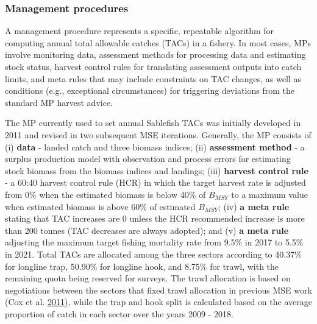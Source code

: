 \documentclass[11pt]{book}
\begin{document}
\hypertarget{management-procedures}{%
\subsubsection{Management procedures}\label{management-procedures}}

A management procedure represents a specific, repeatable algorithm for computing annual total allowable catches (TACs) in a fishery. In most cases, MPs involve monitoring data, assessment methods for processing data and estimating stock status, harvest control rules for translating assessment outputs into catch limits, and meta rules that may include constraints on TAC changes, as well as conditions (e.g., exceptional circumstances) for triggering deviations from the standard MP harvest advice.

The MP currently used to set annual Sablefish TACs was initially developed in 2011 and revised in two subsequent MSE iterations. Generally, the MP consists of (i) \textbf{data} - landed catch and three biomass indices; (ii) \textbf{assessment method} - a surplus production model with observation and process errors for estimating stock biomass from the biomass indices and landings; (iii) \textbf{harvest control rule} - a 60:40 harvest control rule (HCR) in which the target harvest rate is adjusted from 0\% when the estimated biomass is below 40\% of \(B_{MSY}\) to a maximum value when estimated biomass is above 60\% of estimated \(B_{MSY}\); (iv) \textbf{a meta rule} stating that TAC increases are 0 unless the HCR recommended increase is more than 200 tonnes (TAC decreases are always adopted); and (v) \textbf{a meta rule} adjusting the maximum target fishing mortality rate from 9.5\% in 2017 to 5.5\% in 2021. Total TACs are allocated among the three sectors according to 40.37\% for longline trap, 50.90\% for longline hook, and 8.75\% for trawl, with the remaining quota being reserved for surveys. The trawl allocation is based on negotiations between the sectors that fixed trawl allocation in previous MSE work (Cox et al. \protect\hyperlink{ref-cox2011management}{2011}), while the trap and hook split is calculated based on the average proportion of catch in each sector over the years 2009 - 2018.
\end{document}
